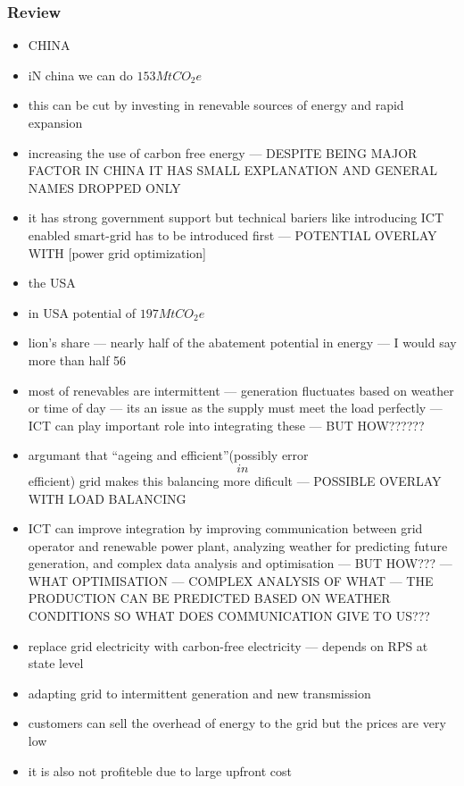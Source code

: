 \documentclass[11pt, twocolumn]{article}
\begin{document}
\subsubsection{Review}
\begin{itemize}
\item CHINA
\item iN china we can do $153 Mt CO_2e$
\item this can be cut by investing in renevable sources of energy and rapid expansion
\item increasing the use of carbon free energy --- DESPITE BEING MAJOR FACTOR IN CHINA IT HAS SMALL EXPLANATION AND GENERAL NAMES DROPPED ONLY
\item it has strong government support but technical bariers like introducing ICT enabled smart-grid has to be introduced first --- POTENTIAL OVERLAY WITH [power grid optimization]

\item the USA
\item in USA potential of $197 MtCO_2e$
\item lion's share --- nearly half of the abatement potential in energy --- I would say more than half 56%
\item most of renevables are intermittent --- generation fluctuates based on weather or time of day --- its an issue as the supply must meet the load perfectly --- ICT can play important role into integrating these --- BUT HOW??????
\item argumant that ``ageing and efficient''(possibly error \[in\]efficient) grid makes this balancing more dificult --- POSSIBLE OVERLAY WITH LOAD BALANCING
\item ICT can improve integration by improving communication between grid operator and renewable power plant, analyzing weather for predicting future generation, and complex data analysis and optimisation --- BUT HOW??? --- WHAT OPTIMISATION --- COMPLEX ANALYSIS OF WHAT --- THE PRODUCTION CAN BE PREDICTED BASED ON WEATHER CONDITIONS SO WHAT DOES COMMUNICATION GIVE TO US???
\item replace grid electricity with carbon-free electricity --- depends on RPS at state level
\item adapting grid to intermittent generation and new transmission
\item customers can sell the overhead of energy to the grid but the prices are very low
\item it is also not profiteble due to large upfront cost


\end{itemize}
\end{document}
